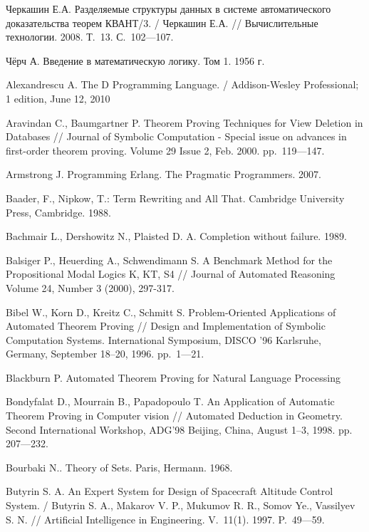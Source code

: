 \begin{thebibliography}{99}
 Черкашин Е.А. Разделяемые структуры данных в системе автоматического доказательства теорем КВАНТ/3. / Черкашин Е.А. // Вычислительные технологии. 2008. Т.~13. С.~102---107.

 Чёрч А. Введение в математическую логику. Том 1. 1956 г.




 Alexandrescu A. The D Programming Language. / Addison-Wesley Professional; 1 edition, June 12, 2010

 Aravindan C., Baumgartner P. Theorem Proving Techniques for View Deletion in Databases // Journal of Symbolic Computation - Special issue on advances in first-order theorem proving. Volume 29 Issue 2, Feb. 2000. pp.~119---147.

 Armstrong J. Programming Erlang. The Pragmatic Programmers. 2007.

 Baader, F., Nipkow, T.: Term Rewriting and All That. Cambridge University Press, Cambridge. 1988.

 Bachmair L., Dershowitz N., Plaisted D. A. Completion without failure. 1989.

 Balsiger P., Heuerding A., Schwendimann S. A Benchmark Method for the Propositional Modal Logics K, KT, S4 // Journal of Automated Reasoning Volume 24, Number 3 (2000), 297-317.

 Bibel W., Korn D., Kreitz C., Schmitt S. Problem-Oriented Applications of Automated Theorem Proving // Design and Implementation of Symbolic Computation Systems. International Symposium, DISCO '96 Karlsruhe, Germany, September 18–20, 1996. pp.~1---21.

 Blackburn P. Automated Theorem Proving for Natural Language Processing

 Bondyfalat D., Mourrain B., Papadopoulo T. An Application of Automatic Theorem Proving in Computer vision // Automated Deduction in Geometry. Second International Workshop, ADG’98 Beijing, China, August 1–3, 1998. pp. 207---232.

 Bourbaki N.. Theory of Sets. Paris, Hermann. 1968.


 Butyrin S. A. An {E}xpert {S}ystem for {D}esign of {S}pacecraft  {A}ltitude {C}ontrol {S}ystem. / Butyrin S. A., Makarov V. P., Mukumov R. R., Somov Ye., Vassilyev S. N. // Artificial Intelligence in Engineering. V.~11(1). 1997. P.~49---59.


\end{thebibliography}
